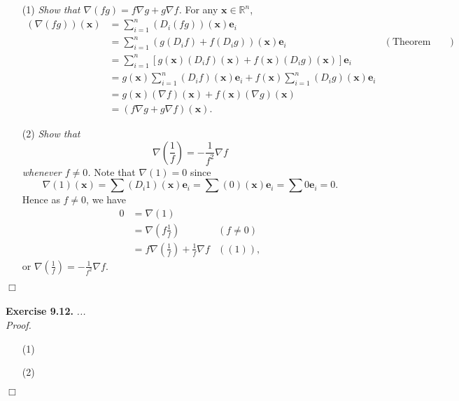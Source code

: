 \documentclass{article}
\begin{document}
\begin{enumerate}
\item[(1)]
  \emph{Show that $\nabla(fg) = f \nabla g + g \nabla f$.}
  For any $\mathbf{x} \in \mathbb{R}^n$,
  \begin{align*}
    (\nabla(fg))(\mathbf{x})
    &= \sum_{i=1}^{n}(D_i(fg))(\mathbf{x})\mathbf{e}_i \\
    &= \sum_{i=1}^{n}(g (D_i f) + f (D_i g))(\mathbf{x})\mathbf{e}_i
      &(\text{Theorem 5.3(b)}) \\
    &= \sum_{i=1}^{n} \left[ g(\mathbf{x}) (D_i f)(\mathbf{x})
      + f(\mathbf{x}) (D_i g)(\mathbf{x}) \right]\mathbf{e}_i \\
    &= g(\mathbf{x}) \sum_{i=1}^{n} (D_i f)(\mathbf{x})\mathbf{e}_i
      + f(\mathbf{x}) \sum_{i=1}^{n} (D_i g)(\mathbf{x})\mathbf{e}_i \\
    &= g(\mathbf{x}) (\nabla f)(\mathbf{x})
      + f(\mathbf{x}) (\nabla g)(\mathbf{x}) \\
    &= (f \nabla g + g \nabla f)(\mathbf{x}).
  \end{align*}

\item[(2)]
  \emph{Show that $$\nabla\left(\frac{1}{f}\right) = -\frac{1}{f^2} \nabla f$$
  whenever $f \neq 0$.}
  Note that $\nabla(1) = 0$
  since
  \[
    \nabla(1)(\mathbf{x})
    = \sum (D_i 1)(\mathbf{x})\mathbf{e}_i
    = \sum (0)(\mathbf{x})\mathbf{e}_i
    = \sum 0 \mathbf{e}_i
    = 0.
  \]
  Hence as $f \neq 0$, we have
  \begin{align*}
    0
    &= \nabla(1) \\
    &= \nabla\left(f \frac{1}{f}\right)
      & (f \neq 0) \\
    &= f \nabla\left(\frac{1}{f}\right) + \frac{1}{f} \nabla f
      & ((1)),
  \end{align*}
  or $\nabla\left(\frac{1}{f}\right) = -\frac{1}{f^2} \nabla f$.
\end{enumerate}
$\Box$ \\\\






\textbf{Exercise 9.12.}
\emph{...} \\

\emph{Proof.}
\begin{enumerate}
\item[(1)]
\item[(2)]

\end{enumerate}
$\Box$ \\\\
\end{document}
